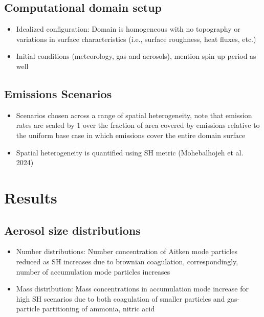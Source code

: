 \documentclass[journal abbreviation, manuscript]{copernicus}
\begin{document}
\subsection{Computational domain setup}
\begin{itemize}
\item Idealized configuration: Domain is homogeneous with no topography or variations in surface characteristics (i.e., surface roughness, heat fluxes, etc.)
\item Initial conditions (meteorology, gas and aerosols), mention spin up period as well
\end{itemize}

\subsection{Emissions Scenarios}
\begin{itemize}
\item Scenarios chosen across a range of spatial heterogeneity, note that emission rates are scaled by 1 over the fraction of area covered by emissions relative to the uniform base case in which emissions cover the entire domain surface
\item Spatial heterogeneity is quantified using SH metric (Mohebalhojeh et al. 2024)
\end{itemize}

\section{Results}

\subsection{Aerosol size distributions}
\begin{itemize}
\item Number distributions: Number concentration of Aitken mode particles reduced as SH increases due to brownian coagulation, correspondingly, number of accumulation mode particles increases 
\item Mass distribution: Mass concentrations in accumulation mode increase for high SH scenarios due to both coagulation of smaller particles and gas-particle partitioning of ammonia, nitric acid
\end{itemize}
\end{document}
